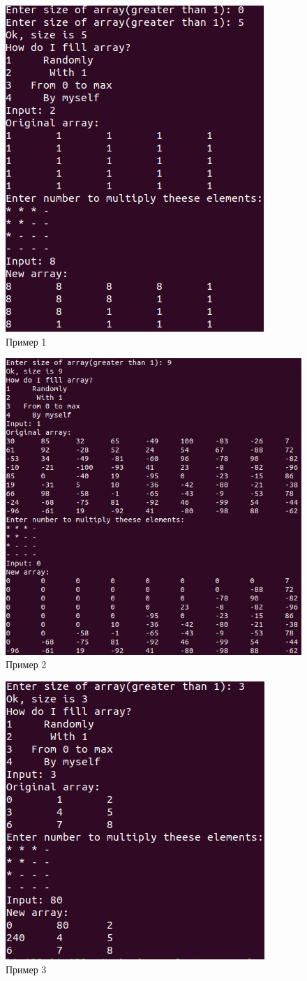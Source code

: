 \documentclass[12pt,a4paper]{article}%
\begin{document}
	\begin{figure}[hpt!]
		\centering
		\includegraphics[width=0.6\linewidth]{t1}
		\caption{Пример 1}
		\label{t1}
	\end{figure}

	\begin{figure}[hpt!]
		\centering
		\includegraphics[width=0.6\linewidth]{t2}
		\caption{Пример 2}
		\label{t2}
	\end{figure}

	\begin{figure}[hpt!]
		\centering
		\includegraphics[width=0.6\linewidth]{t3}
		\caption{Пример 3}
		\label{t3}
	\end{figure}
	
\end{document}
